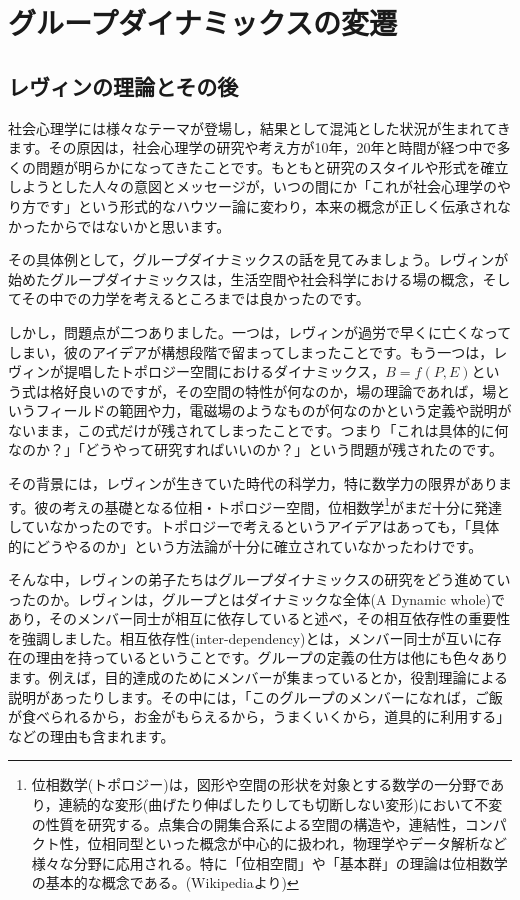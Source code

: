 \documentclass{ltjsbook}
\begin{document}
\section{グループダイナミックスの変遷}
\subsection{レヴィンの理論とその後}
社会心理学には様々なテーマが登場し，結果として混沌とした状況が生まれてきます。その原因は，社会心理学の研究や考え方が10年，20年と時間が経つ中で多くの問題が明らかになってきたことです。もともと研究のスタイルや形式を確立しようとした人々の意図とメッセージが，いつの間にか「これが社会心理学のやり方です」という形式的なハウツー論に変わり，本来の概念が正しく伝承されなかったからではないかと思います。

その具体例として，グループダイナミックスの話を見てみましょう。レヴィンが始めたグループダイナミックスは，生活空間や社会科学における場の概念，そしてその中での力学を考えるところまでは良かったのです。

しかし，問題点が二つありました。一つは，レヴィンが過労で早くに亡くなってしまい，彼のアイデアが構想段階で留まってしまったことです。もう一つは，レヴィンが提唱したトポロジー空間におけるダイナミックス，$B=f(P,E)$という式は格好良いのですが，その空間の特性が何なのか，場の理論であれば，場というフィールドの範囲や力，電磁場のようなものが何なのかという定義や説明がないまま，この式だけが残されてしまったことです。つまり「これは具体的に何なのか？」「どうやって研究すればいいのか？」という問題が残されたのです。

その背景には，レヴィンが生きていた時代の科学力，特に数学力の限界があります。彼の考えの基礎となる位相・トポロジー空間，位相数学\footnote{位相数学(トポロジー)は，図形や空間の形状を対象とする数学の一分野であり，連続的な変形(曲げたり伸ばしたりしても切断しない変形)において不変の性質を研究する。点集合の開集合系による空間の構造や，連結性，コンパクト性，位相同型といった概念が中心的に扱われ，物理学やデータ解析など様々な分野に応用される。特に「位相空間」や「基本群」の理論は位相数学の基本的な概念である。(Wikipediaより)}がまだ十分に発達していなかったのです。トポロジーで考えるというアイデアはあっても，「具体的にどうやるのか」という方法論が十分に確立されていなかったわけです。

そんな中，レヴィンの弟子たちはグループダイナミックスの研究をどう進めていったのか。レヴィンは，グループとはダイナミックな全体(A Dynamic whole)であり，そのメンバー同士が相互に依存していると述べ，その相互依存性の重要性を強調しました。相互依存性(inter-dependency)とは，メンバー同士が互いに存在の理由を持っているということです。グループの定義の仕方は他にも色々あります。例えば，目的達成のためにメンバーが集まっているとか，役割理論による説明があったりします。その中には，「このグループのメンバーになれば，ご飯が食べられるから，お金がもらえるから，うまくいくから，道具的に利用する」などの理由も含まれます。
\end{document}
